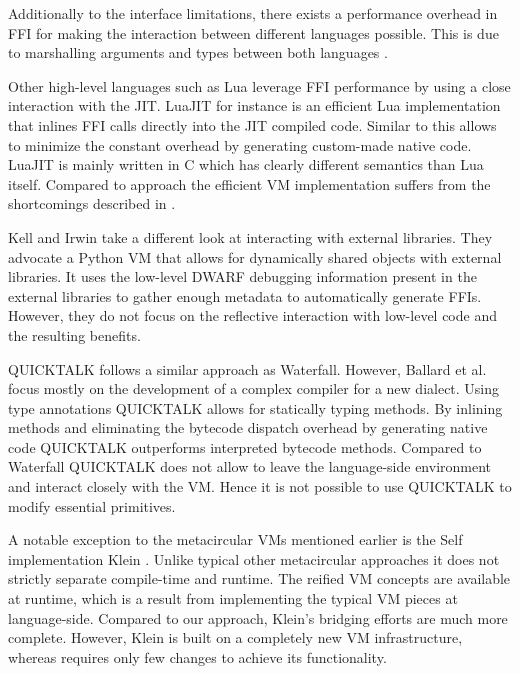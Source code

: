 Additionally to the interface limitations, there exists a performance overhead in FFI for making the interaction between different languages possible. 
This is due to marshalling arguments and types between both languages \cite{Fish00a,Repp06b}.


Other high-level languages such as Lua leverage FFI performance by using a close interaction with the JIT.
LuaJIT \cite{luaffi} for instance is an efficient Lua implementation that inlines FFI calls directly into the JIT compiled code.
Similar to \B this allows to minimize the constant overhead by generating custom-made native code.
LuaJIT is mainly written in C which has clearly different semantics than Lua itself.
Compared to  approach the efficient VM implementation suffers from the shortcomings described in . 

Kell and Irwin \cite{Kell11a} take a different look at interacting with external libraries.
They advocate a Python VM that allows for dynamically shared objects with external libraries.
It uses the low-level DWARF debugging information present in the external libraries to gather enough metadata to automatically generate FFIs.
However, they do not focus on the reflective interaction with low-level code and the resulting benefits. 

QUICKTALK \cite{Ball86a} follows a similar approach as Waterfall.
However, Ballard et al. focus mostly on the development of a complex compiler for a new \ST dialect.
Using type annotations QUICKTALK allows for statically typing methods.
By inlining methods and eliminating the bytecode dispatch overhead by generating native code QUICKTALK outperforms interpreted bytecode methods.
Compared to Waterfall QUICKTALK does not allow to leave the language-side environment and interact closely with the VM.
Hence it is not possible to use QUICKTALK to modify essential primitives.

A notable exception to the metacircular VMs mentioned earlier is the Self implementation Klein \cite{Unga05a}.
Unlike typical other metacircular approaches it does not strictly separate compile-time and runtime.
The reified VM concepts are available at runtime, which is a result from implementing the typical VM pieces at language-side.
Compared to our approach, Klein's bridging efforts are much more complete.
However, Klein is built on a completely new VM infrastructure, whereas \B requires only few changes to achieve its functionality.


